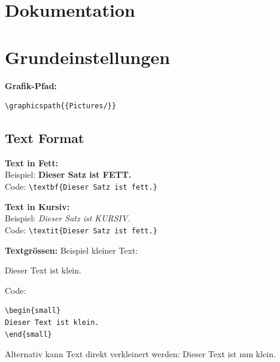
\section{Dokumentation}


\section{Grundeinstellungen}

\textbf{Grafik-Pfad:}
\begin{verbatim}
\graphicspath{{Pictures/}}
\end{verbatim}

\vspace{\baselineskip}

\pagebreak
\subsection{Text Format}

\textbf{Text in Fett:}\\ Beispiel: \textbf{Dieser Satz ist FETT.}\\ Code: \verb+\textbf{Dieser Satz ist fett.}+

\vspace{\baselineskip}

\textbf{Text in Kursiv:}\\ Beispiel: \textit{Dieser Satz ist KURSIV.}\\ Code: \verb+\textit{Dieser Satz ist fett.}+

\vspace{\baselineskip}

\textbf{Textgrössen:}
Beispiel kleiner Text:
\begin{small}
Dieser Text ist klein.
\end{small}

Code:
\begin{verbatim}
\begin{small}
Dieser Text ist klein.
\end{small}
\end{verbatim}

Alternativ kann Text direkt verkleinert werden: \small{Dieser Text ist nun klein.} \normalsize{}

